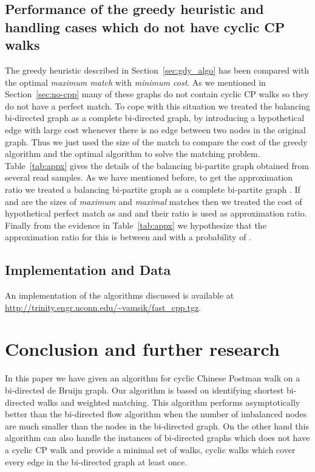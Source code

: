 \documentclass[runningheads]{llncs}
\begin{document}
\subsection{Performance of the greedy heuristic and handling cases which do not have cyclic CP walks}
\label{sec:gdy_heuristic}
The greedy heuristic described in Section~\ref{sec:gdy_algo} has been compared with the optimal
{\em maximum match} with {\em minimum cost}. As we mentioned in Section~\ref{sec:no-cpp} many 
of these graphs do not contain cyclic CP walks so they do not have a perfect match. To cope with
this situation we treated the balancing bi-directed graph as a complete bi-directed graph, by
introducing a hypothetical edge with large cost whenever there is no edge between two nodes
in the original graph. Thus we just used the size of the match to compare the cost of the greedy
algorithm and the optimal algorithm to solve the matching problem. Table~\ref{tab:appx} gives
the details of the balancing bi-partite graph obtained from several read samples. As we have
mentioned before, to get the approximation ratio we treated a balancing bi-partite graph as a complete
bi-partite graph . If  and  are the sizes of {\em maximum} and {\em maximal}
matches then we treated the cost of hypothetical perfect match as  and 
and their ratio is used as approximation ratio. Finally from the evidence in Table~\ref{tab:appx}
we hypothesize that the approximation ratio for this is between  and  with a probability
of .

\subsection{Implementation and Data}
An implementation of the algorithms discussed is available at \url{http://trinity.engr.uconn.edu/~vamsik/fast_cpp.tgz}.

\section{Conclusion and further research}
In this paper we have given an algorithm for cyclic Chinese Postman walk on a bi-directed de Bruijn graph. Our
algorithm is based on identifying shortest bi-directed walks and weighted matching. This algorithm performs
asymptotically better than the bi-directed flow algorithm when the number of imbalanced nodes are much smaller
than the nodes in the bi-directed graph. On the other hand this algorithm can also handle the instances of
bi-directed graphs which does not have a cyclic CP walk and provide a minimal set of walks, cyclic walks
which cover every edge in the bi-directed graph at least once. 
\end{document}
